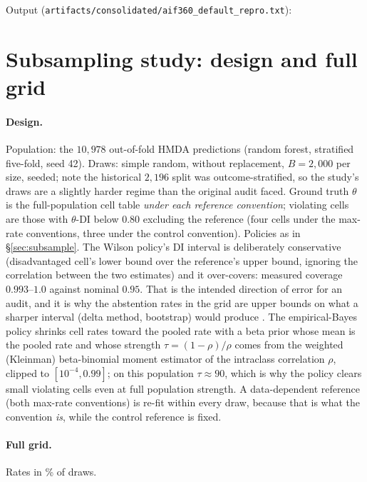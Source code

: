 \documentclass[sigconf,nonacm]{acmart}
\begin{document}
\noindent Output (\texttt{artifacts/consolidated/aif360\_default\_repro.txt}):

{\scriptsize}

\section{Subsampling study: design and full grid}
\label{app:subsample}

\paragraph{Design.} Population: the $10{,}978$ out-of-fold HMDA predictions
(random forest, stratified five-fold, seed 42). Draws: simple random, without
replacement, $B{=}2{,}000$ per size, seeded; note the historical $2{,}196$
split was outcome-stratified, so the study's draws are a slightly harder
regime than the original audit faced. Ground truth $\theta$ is the
full-population cell table \emph{under each reference convention}; violating
cells are those with $\theta$-DI below $0.80$ excluding the reference (four
cells under the max-rate conventions, three under the control convention).
Policies as in \S\ref{sec:subsample}. The Wilson policy's DI interval is
deliberately conservative (disadvantaged cell's lower bound over the
reference's upper bound, ignoring the correlation between the two estimates)
and it over-covers: measured coverage $0.993$--$1.0$ against nominal
$0.95$. That is the intended direction of error for an audit, and it is why
the abstention rates in the grid are upper bounds on what a sharper interval
(delta method, bootstrap) would produce \citep{chen2018}. The empirical-Bayes
policy shrinks cell rates toward the pooled rate with a beta prior whose mean
is the pooled rate and whose strength $\tau = (1-\rho)/\rho$ comes from the
weighted (Kleinman) beta-binomial moment estimator of the intraclass
correlation $\rho$, clipped to $[10^{-4}, 0.99]$; on this population
$\tau \approx 90$, which is why the policy clears small violating cells even
at full population strength. A data-dependent reference (both max-rate
conventions) is re-fit within every draw, because that is what the convention
\emph{is}, while the control reference is fixed.

\paragraph{Full grid.} Rates in \% of draws.
\end{document}
